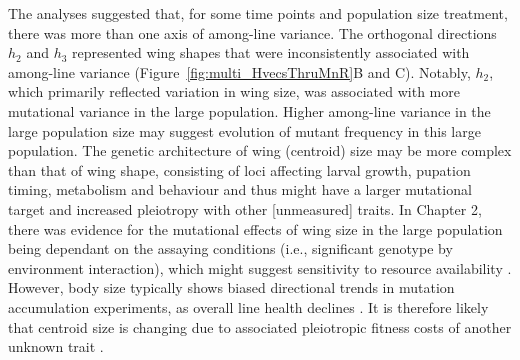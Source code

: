 The analyses suggested that, for some time points and population size treatment, there was more than one axis of among-line variance. The orthogonal directions $h_2$ and $h_3$ represented wing shapes that were inconsistently associated with among-line variance (Figure~\ref{fig:multi_HvecsThruMnR}B and C). Notably, $h_2$, which primarily reflected variation in wing size, was associated with more mutational variance in the large population. Higher among-line variance in the large population size may suggest evolution of mutant frequency in this large population. The genetic architecture of wing (centroid) size may be more complex than that of wing shape, consisting of loci affecting larval growth, pupation timing, metabolism and behaviour \citep[e.g., food acquisition;][]{Roff81, Houl98} and thus might have a larger mutational target and increased pleiotropy with other [unmeasured] traits. In Chapter 2, there was evidence for the mutational effects of wing size in the large population being dependant on the assaying conditions (i.e., significant genotype by environment interaction), which might suggest sensitivity to resource availability \citep{Cavi85, Bitn99}. However, body size typically shows biased directional trends in mutation accumulation experiments, as overall line health declines \citep{Este05}. It is therefore likely that centroid size is changing due to associated pleiotropic fitness costs of another unknown trait \citep{McGu11b}.\par  

